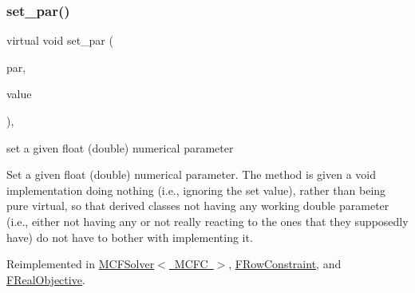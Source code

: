 \mbox{\label{class_s_m_spp__di__unipi__it_1_1_thin_compute_interface_a602be88195984f4f1b5dff7995976530}} 
\subsubsection{\texorpdfstring{set\+\_\+par()}{set\_par()}\hspace{0.1cm}{\footnotesize\ttfamily [2/3]}}
{\footnotesize\ttfamily virtual void set\+\_\+par (\begin{DoxyParamCaption}\item[{const \mbox{\hyperlink{class_s_m_spp__di__unipi__it_1_1_thin_compute_interface_aa3d710629ad8c434286726ad810c3b47}{idx\+\_\+type}}}]{par,  }\item[{const double}]{value }\end{DoxyParamCaption})\hspace{0.3cm}{\ttfamily [inline]}, {\ttfamily [virtual]}}



set a given float (double) numerical parameter 

Set a given float (double) numerical parameter. The method is given a void implementation doing nothing (i.\+e., ignoring the set value), rather than being pure virtual, so that derived classes not having any working double parameter (i.\+e., either not having any or not really reacting to the ones that they supposedly have) do not have to bother with implementing it. 

Reimplemented in \mbox{\hyperlink{class_s_m_spp__di__unipi__it_1_1_m_c_f_solver_a341557f3dd81bff0f060dbe41a4ba325}{M\+C\+F\+Solver$<$ M\+C\+F\+C $>$}}, \mbox{\hyperlink{class_s_m_spp__di__unipi__it_1_1_f_row_constraint_a341557f3dd81bff0f060dbe41a4ba325}{F\+Row\+Constraint}}, and \mbox{\hyperlink{class_s_m_spp__di__unipi__it_1_1_f_real_objective_a341557f3dd81bff0f060dbe41a4ba325}{F\+Real\+Objective}}.

\mbox{\label{class_s_m_spp__di__unipi__it_1_1_thin_compute_interface_acefe0a2a66d64babff1331eba9cac34d}} 
